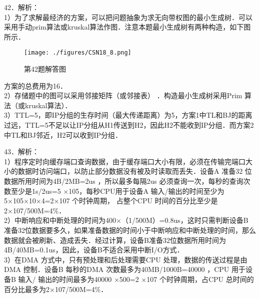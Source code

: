 42．解析： \\
1）为了求解最经济的方案，可以把问题抽象为求无向带权图的最小生成树．可以采用手动prim算法或kruskal算法作图．注意本题最小生成树有两种构造，如下图所示．
\begin{figure}[ht]
\centering
\texttt{[image: ./figures/CSN18\_8.png]}
\caption{第42题解答图} \label{CSN18_fig8}
\end{figure}
方案的总费用为16． \\
2）存储题中的图可以采用邻接矩阵（或邻接表） ．构造最小生成树采用Prim 算法（或kruskal算法）． \\
3）TTL=5，即IP分组的生存时间（最大传递距离）为5，方案1中TL和BJ的距离过远，TTL=5不足以让IP分组从H1传送到H2，因此H2不能收到IP分组．而方案2中TL和BJ邻近，H2可以收到IP分组．

43．解析： \\
1）程序定时向缓存端口查询数据，由于缓存端口大小有限，必须在传输完端口大小的数据时访问端口，以防止部分数据没有被及时读取而丢失．设备A 准备32 位数据所用时间为4B/2MB=2us ，所以最多每隔2us 必须查询一次，每秒的查询次数至少是1s/2us=5 ×105，每秒CPU用于设备A 输入/输出的时间至少为5×105×10×4=2×107 个时钟周期， 占整个CPU 时间的百分比至少是2×107/500M=4\%． \\
2）中断响应和中断处理的时间为400×（1/500M）=0.8us，这时只需判断设备B 准备32位数据要多久，如果准备数据的时间小于中断响应和中断处理的时间，那么数据就会被刷新、造成丢失．经过计算，设备B准备32位数据所用时间为4B/40MB=0.1us，因此，设备B不适合采用中断I/O方式． \\
3）在DMA 方式中，只有预处理和后处理需要CPU 处理，数据的传送过程是由DMA 控制．设备B 每秒的DMA 次数最多为40MB/1000B=40000 ，CPU 用于设备B 输入/ 输出的时间最多为40000 ×500=2 ×107 个时钟周期，占CPU 总时间的百分比最多为2×107/500M=4\%．

